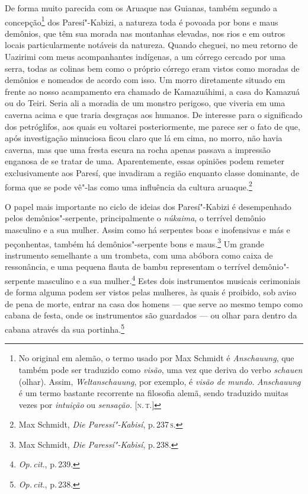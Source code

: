 De forma muito parecida com os Aruaque nas Guianas, também segundo a
concepção\footnote{No original em alemão, o termo usado por Max
  Schmidt é \textit{Anschauung}, que também pode ser traduzido como
  \textit{visão}, uma vez que deriva do verbo \textit{schauen} (olhar).
  Assim, \textit{Weltanschauung}, por exemplo, é \textit{visão de mundo}.
  \textit{Anschauung} é um termo bastante recorrente na filosofia alemã,
  sendo traduzido muitas vezes por \textit{intuição} ou \textit{sensação.}
  {[}\textsc{n.\,t.}{]}} dos Paresí"-Kabizi, a natureza toda é povoada por bons e maus
demônios, que têm sua morada nas montanhas elevadas, nos rios e em
outros locais particularmente notáveis da natureza. Quando cheguei, no
meu retorno de Uazirimi com meus acompanhantes indígenas, a um córrego
cercado por uma serra, todas as colinas bem como o próprio córrego eram
vistos como moradas de demônios e nomeados de acordo com isso. Um morro
diretamente situado em frente ao nosso acampamento era chamado de
Kamazuáhimi, a casa do Kamazuá ou do Teiri. Seria ali a moradia de um
monstro perigoso, que viveria em uma caverna acima e que traria
desgraças aos humanos. De interesse para o significado dos petróglifos,
aos quais eu voltarei posteriormente, me parece ser o fato de que, após
investigação minuciosa ficou claro que lá em cima, no morro, não havia
caverna, mas que uma fresta escura na rocha apenas passava a impressão
enganosa de se tratar de uma. Aparentemente, essas opiniões podem
remeter exclusivamente aos Paresí, que invadiram a região enquanto
classe dominante, de forma que se pode vê"-las como uma influência da
cultura aruaque.\footnote{Max Schmidt, \textit{Die Paressí"-Kabisí}, p.\,237\,\textsc{s}.}

{O papel mais importante no ciclo de ideias dos Paresí"-Kabizi é
desempenhado pelos demônios"-serpente, principalmente o \textit{núkaima},
o terrível demônio masculino e a sua mulher. Assim como há serpentes
boas e inofensivas e más e peçonhentas, também há demônios"-serpente
bons e maus.\footnote{Max Schmidt, \textit{Die Paressí"-Kabisí}, p.\,238.} Um
grande instrumento semelhante a um trombeta, com uma abóbora como caixa
de ressonância, e uma pequena flauta de bambu representam o terrível
demônio"-serpente masculino e a sua mulher.\footnote{\textit{Op.\,cit}., p.\,239.}
Estes dois instrumentos musicais cerimoniais de forma alguma podem ser
vistos pelas mulheres, às quais é proibido, sob aviso de pena de morte,
entrar na casa dos homens --- que serve ao mesmo tempo como cabana de
festa, onde os instrumentos são guardados --- ou olhar para dentro da
cabana através da sua portinha.\footnote{\textit{Op.\,cit}., p.\,238.}}

